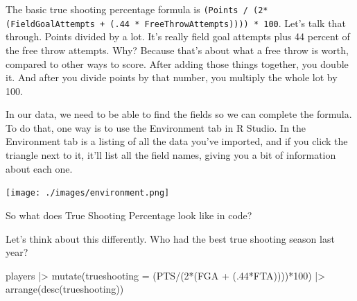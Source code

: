 \documentclass[
  letterpaper,
  DIV=11,
  numbers=noendperiod]{scrreprt}
\newenvironment{Shaded}{\begin{snugshade}}{\end{snugshade}}
\newcommand{\AttributeTok}[1]{\textcolor[rgb]{0.40,0.45,0.13}{#1}}
\newcommand{\DecValTok}[1]{\textcolor[rgb]{0.68,0.00,0.00}{#1}}
\newcommand{\FunctionTok}[1]{\textcolor[rgb]{0.28,0.35,0.67}{#1}}
\newcommand{\NormalTok}[1]{\textcolor[rgb]{0.00,0.23,0.31}{#1}}
\newcommand{\SpecialCharTok}[1]{\textcolor[rgb]{0.37,0.37,0.37}{#1}}
\begin{document}
The basic true shooting percentage formula is
\texttt{(Points\ /\ (2*(FieldGoalAttempts\ +\ (.44\ *\ FreeThrowAttempts))))\ *\ 100}.
Let's talk that through. Points divided by a lot. It's really field goal
attempts plus 44 percent of the free throw attempts. Why? Because that's
about what a free throw is worth, compared to other ways to score. After
adding those things together, you double it. And after you divide points
by that number, you multiply the whole lot by 100.

In our data, we need to be able to find the fields so we can complete
the formula. To do that, one way is to use the Environment tab in R
Studio. In the Environment tab is a listing of all the data you've
imported, and if you click the triangle next to it, it'll list all the
field names, giving you a bit of information about each one.

\texttt{[image: ./images/environment.png]}

So what does True Shooting Percentage look like in code?

Let's think about this differently. Who had the best true shooting
season last year?

\begin{Shaded}
\begin{Highlighting}[]
\NormalTok{players }\SpecialCharTok{|\textgreater{}}
  \FunctionTok{mutate}\NormalTok{(}\AttributeTok{trueshooting =}\NormalTok{ (PTS}\SpecialCharTok{/}\NormalTok{(}\DecValTok{2}\SpecialCharTok{*}\NormalTok{(FGA }\SpecialCharTok{+}\NormalTok{ (.}\DecValTok{44}\SpecialCharTok{*}\NormalTok{FTA))))}\SpecialCharTok{*}\DecValTok{100}\NormalTok{) }\SpecialCharTok{|\textgreater{}}
  \FunctionTok{arrange}\NormalTok{(}\FunctionTok{desc}\NormalTok{(trueshooting))}
\end{Highlighting}
\end{Shaded}
\end{document}
